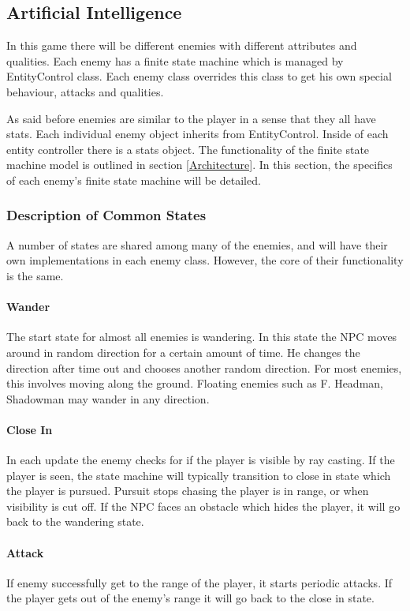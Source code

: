 \documentclass{article}
\begin{document}
\subsection{Artificial Intelligence}

In this game there will be different enemies with different attributes and qualities. Each enemy has a finite state machine which is managed by EntityControl class. Each enemy class overrides this class to get his own special behaviour, attacks and qualities.

As said before enemies are similar to the player in a sense that they all have stats. Each individual enemy object inherits from EntityControl.  Inside of each entity controller there is a
stats object.   The functionality of the finite state machine model is outlined in section \ref{Architecture}.  In this section, the specifics of each enemy's finite state machine will be detailed.

\subsubsection{Description of Common States}
A number of states are shared among many of the enemies, and will have their own implementations in each enemy class.  However, the core of their functionality is the same.

\paragraph{Wander}
The start state for almost all enemies is wandering. In this state the NPC moves around in random direction for a certain amount of time. He changes the direction after time out and
chooses another random direction.  For most enemies, this involves moving along the ground.  Floating enemies such as F. Headman, Shadowman may wander in any direction.

\paragraph{Close In}
In each update the enemy checks for if the player is visible by ray casting.  If the player is seen, the state machine will typically transition to close in state which the player is pursued.  Pursuit stops chasing the player is in range, or when visibility is cut off.  If the NPC faces an obstacle which hides the player, it will go back to the wandering state.

\paragraph{Attack}
If enemy successfully get to the range of the player, it starts periodic attacks.  If the player gets out of the enemy’s range it will go back to the close in state.
\end{document}
